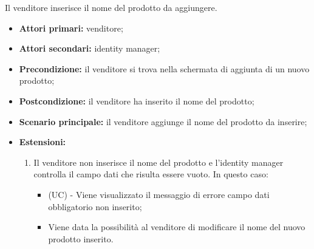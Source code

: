 \resetSubUC
{}
Il venditore inserisce il nome del prodotto da aggiungere.
\begin{itemize}
    \item \textbf{Attori primari:} venditore;
    \item \textbf{Attori secondari:} identity manager;
    \item \textbf{Precondizione:} il venditore si trova nella schermata di aggiunta di un nuovo prodotto;
    \item \textbf{Postcondizione:} il venditore ha inserito il nome del prodotto;
    \item \textbf{Scenario principale:} il venditore aggiunge il nome del prodotto da inserire;
    \item \textbf{Estensioni:} 
    \begin{enumerate}[label=\lett]
    	\item Il venditore non inserisce il nome del prodotto e l'identity manager controlla il campo dati che risulta essere vuoto. In questo caso:
	    \begin{itemize}
	        \item (UC) - Viene visualizzato il messaggio di errore campo dati obbligatorio non inserito;
	        \item Viene data la possibilità al venditore di modificare il nome del nuovo prodotto inserito.
	    \end{itemize}
	\end{enumerate}
\end{itemize}

